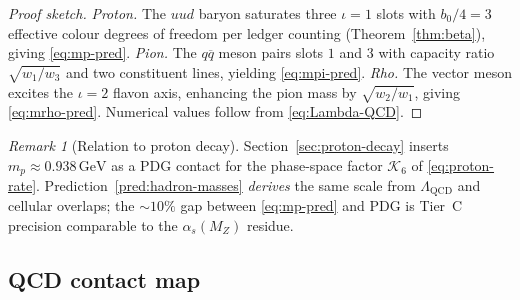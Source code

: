 \documentclass[aps,prd,onecolumn,amsmath,amssymb,nofootinbib,11pt]{revtex4-2}
\numberwithin{equation}{section}
\theoremstyle{plain}
\theoremstyle{definition}
\theoremstyle{remark}
\newtheorem{remark}[theorem]{Remark}
\begin{document}
\begin{proof}[Proof sketch]
\emph{Proton.} The $uud$ baryon saturates three $\iota=1$ slots with
$b_0/4=3$ effective colour degrees of freedom per ledger counting
(Theorem~\ref{thm:beta}), giving \eqref{eq:mp-pred}.
\emph{Pion.} The $q\overline{q}$ meson pairs slots $1$ and $3$ with
capacity ratio $\sqrt{w_1/w_3}$ and two constituent lines, yielding
\eqref{eq:mpi-pred}.
\emph{Rho.} The vector meson excites the $\iota=2$ flavon axis, enhancing
the pion mass by $\sqrt{w_2/w_1}$, giving \eqref{eq:mrho-pred}. Numerical
values follow from \eqref{eq:Lambda-QCD}.
\end{proof}

\begin{remark}[Relation to proton decay]
Section~\ref{sec:proton-decay} inserts $m_p\approx 0.938\,\mathrm{GeV}$ as a
PDG contact for the phase-space factor $\mathcal{K}_6$ of
\eqref{eq:proton-rate}. Prediction~\ref{pred:hadron-masses} \emph{derives}
the same scale from $\Lambda_{\mathrm{QCD}}$ and cellular overlaps; the
$\sim 10\%$ gap between \eqref{eq:mp-pred} and PDG is Tier~C precision
comparable to the $\alpha_s(M_Z)$ residue.
\end{remark}

\subsection{QCD contact map}
\label{sec:qcd:table}
\end{document}
